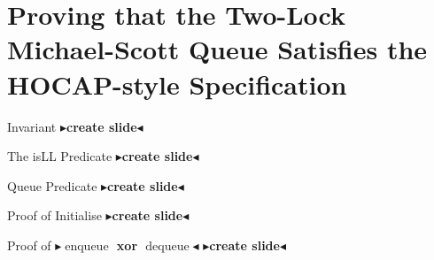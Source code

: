\documentclass[9pt]{beamer}
\newcommand{\enqueue}{\operatorname{enqueue}}
\newcommand{\dequeue}{\operatorname{dequeue}}
\newcommand{\todo}[1]{{\color[rgb]{.5,0,0}\textbf{$\blacktriangleright$#1$\blacktriangleleft$}}}
\begin{document}

\section{Proving that the Two-Lock Michael-Scott Queue Satisfies the HOCAP-style Specification}

\begin{frame}{Invariant}
  \todo{create slide}
\end{frame}

\begin{frame}{The isLL Predicate}
  \todo{create slide}
\end{frame}

\begin{frame}{Queue Predicate}
  \todo{create slide}
\end{frame}

\begin{frame}{Proof of Initialise}
  \todo{create slide}
\end{frame}

\begin{frame}{Proof of \todo{$\enqueue$ xor $\dequeue$} }
  \todo{create slide}
\end{frame}
\end{document}
